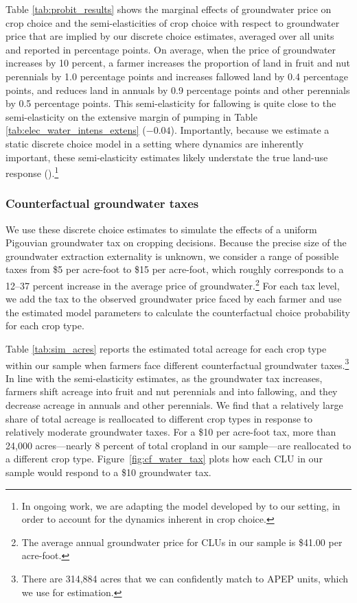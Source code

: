 Table \ref{tab:probit_results} shows the marginal effects of groundwater price on crop choice and the semi-elasticities of crop choice with respect to groundwater price that are implied by our discrete choice estimates, averaged over all units and reported in percentage points. On average, when the price of groundwater increases by 10 percent, a farmer increases the proportion of land in fruit and nut perennials by 1.0 percentage points and increases fallowed land by 0.4 percentage points, and reduces land in annuals by 0.9 percentage points and other perennials by 0.5 percentage points. This semi-elasticity for fallowing is quite close to the semi-elasticity on the extensive margin of pumping in Table \ref{tab:elec_water_intens_extens} ($-0.04$). Importantly, because we estimate a static discrete choice model in a setting where dynamics are inherently important, these semi-elasticity estimates likely understate the true land-use response (\textcite{scott2013}).\footnote{In ongoing work, we are adapting the model developed by \textcite{scott2013} to our setting, in order to account for the dynamics inherent in crop choice.}

\subsubsection{Counterfactual groundwater taxes}
\label{sec:cf_gw_taxes}
We use these discrete choice estimates to simulate the effects of a uniform Pigouvian groundwater tax on cropping decisions. Because the precise size of the groundwater extraction externality is unknown, we consider a range of possible taxes from \$5 per acre-foot to \$15 per acre-foot, which roughly corresponds to a 12--37 percent increase in the average price of groundwater.\footnote{The average annual groundwater price for CLUs in our sample is \$41.00 per acre-foot.} For each tax level, we add the tax to the observed groundwater price faced by each farmer and use the estimated model parameters to calculate the counterfactual choice probability for each crop type.

Table \ref{tab:sim_acres} reports the estimated total acreage for each crop type within our sample  when farmers face different counterfactual groundwater taxes.\footnote{There are 314,884 acres that we can confidently match to APEP units, which we use for estimation.} In line with the semi-elasticity estimates, as the groundwater tax increases, farmers shift acreage into fruit and nut perennials and into fallowing, and they decrease acreage in annuals and other perennials. We find that a relatively large share of total acreage is reallocated to different crop types in response to relatively moderate groundwater taxes. For a \$10 per acre-foot tax, more than 24,000 acres---nearly 8 percent of total cropland in our sample---are reallocated to a different crop type. Figure~\ref{fig:cf_water_tax} plots how each CLU in our sample would respond to a \$10 groundwater tax. 

